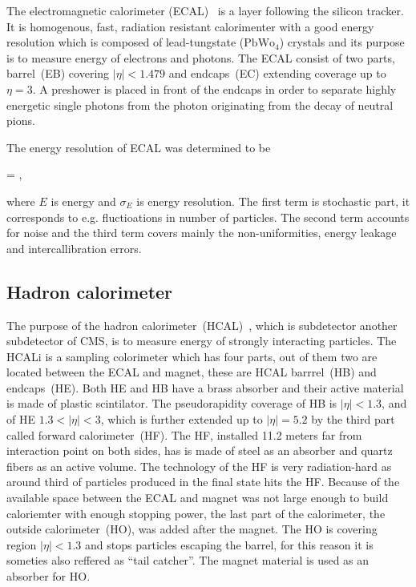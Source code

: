 The electromagnetic calorimeter (ECAL)~\cite{tdrECAL} is a layer following the silicon tracker. It is homogenous, fast, radiation resistant calorimenter with a good energy resolution which is composed of lead-tungstate ($\mathrm{PbWo_{4}}$) crystals and its purpose is to measure energy of electrons and photons. The ECAL consist of two parts, barrel~(EB) covering $|\eta|<1.479$ and endcaps~(EC) extending coverage up to $\eta =3$. A preshower is placed in front of the endcaps in order to separate highly energetic single photons from the photon originating from the decay of neutral pions.

The energy resolution of ECAL was determined to be

{
  =  \bigoplus {}  ,
}

where $E$ is energy and $\sigma_{E}$ is energy resolution. The first term is stochastic part, it corresponds to e.g. fluctioations in number of particles. The second term accounts for noise and the third term covers mainly the non-uniformities, energy leakage and intercallibration errors.


\subsection{Hadron calorimeter}

The purpose of the hadron calorimeter~(HCAL)~\cite{tdrHCAL}, which is subdetector another subdetector of CMS, is to measure energy of strongly interacting particles.  The HCALi is a sampling colorimeter which has four parts, out of them two are located between the ECAL and magnet, these are HCAL barrrel~(HB) and endcaps~(HE). Both HE and HB have a brass absorber and their active material is made of plastic scintilator. The pseudorapidity coverage of HB is $|\eta|<1.3$, and of HE $1.3<|\eta|<3$, which is further extended up to $|\eta|=5.2$ by the third part called forward calorimeter~(HF). The HF, installed 11.2 meters far from interaction point on both sides, has is made of steel as an absorber and quartz fibers as an active volume. The technology of the HF is very radiation-hard as around third of particles produced in the final state hits the HF. Because of the available space between the ECAL and magnet was not large enough to build caloriemter with enough stopping power, the last part of the calorimeter, the outside calorimeter~(HO), was added after the magnet. The HO is covering region $|\eta|<1.3$ and stops particles escaping the barrel, for this reason it is someties also reffered as ``tail catcher''. The magnet material is used as an absorber for HO.

